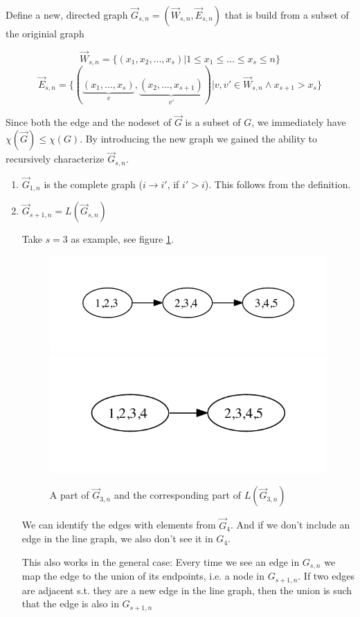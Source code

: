\begin{pr} Define a new, directed graph $\vec G_{s,n} = (\vec W_{s,n}, \vec E_{s,n})$ that is build from a subset of the originial graph

\[\vec W_{s,n} = \{(x_1,x_2,\ldots,x_s) | 1\leq x_1\leq \ldots \leq x_s \leq n\}\]
\[\vec E_{s,n} = \{(\underbrace{(x_1,\ldots,x_s)}_{v},\underbrace{(x_2,\ldots,x_{s+1})}_{v'})| v,v'\in \vec W_{s,n} \wedge x_{s+1} > x_s\}\]

Since both the edge and the nodeset of $\vec G$ is a subset of $G$, we immediately have $\chi(\vec G)\leq \chi(G)$. By introducing the new graph we gained the ability to recursively characterize $\vec G_{s,n}$.

\begin{enumerate}
\item $\vec G_{1,n}$ is the complete graph ($i\rightarrow i'$, if $i'>i$). This follows from the definition.
\item $\vec G_{s+1,n} = L(\vec G_{s,n})$

Take $s=3$ as example, see figure \ref{fig:g3_l3}.

\begin{figure}[hbt]
\begin{center}
\includegraphics[width=0.58\linewidth]{./images/g3_extr} \includegraphics[width=0.4\linewidth]{./images/L(G3)}
\end{center}
\caption{A part of $\vec G_{3,n}$ and the corresponding part of $L(\vec G_{3,n})$}
\label{fig:g3_l3}
\end{figure}

We can identify the edges with elements from $\vec G_4$. And if we don't include an edge in the line graph, we also don't see it in $G_4$.

This also works in the general case: Every time we see an edge in $G_{s,n}$ we map the edge to the union of its endpoints, i.e. a node in $G_{s+1,n}$. If two edges are adjacent s.t. they are a new edge in the line graph, then the union is such that the edge is also in $G_{s+1,n}$
\end{enumerate}
\end{pr}

